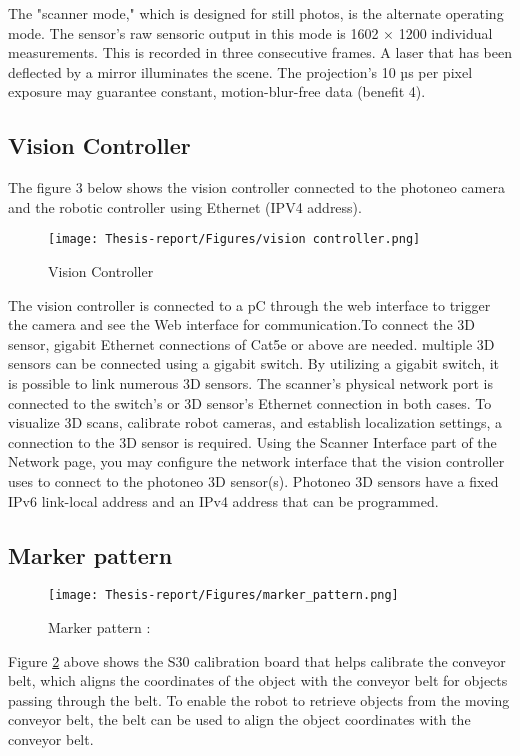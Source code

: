\documentclass[12pt]{article}
\begin{document}
The "scanner mode," which is designed for still photos, is the alternate operating mode.
 The sensor's raw sensoric output in this mode is 1602 × 1200 individual measurements. This is recorded in three consecutive frames. A laser that has been deflected by a mirror illuminates the scene.  The projection's 10 µs per pixel exposure may guarantee constant, motion-blur-free data (benefit 4)\cite{ref15}.


\subsection{Vision Controller}
The figure 3 below shows the vision controller connected to the photoneo camera and the robotic controller using Ethernet (IPV4 address).
\begin{figure}[h]
    \centering
    \texttt{[image: Thesis-report/Figures/vision controller.png]}
    \caption{Vision Controller \cite{ref2}}
    \label{fig:vision-controller}
\end{figure}
The vision controller is connected to a pC through the web interface to trigger the camera and see the Web interface for communication.To connect the 3D sensor, gigabit Ethernet connections of Cat5e or above are needed.  multiple 3D sensors can be connected using a gigabit switch.  By utilizing a gigabit switch, it is possible to link numerous 3D sensors.  The scanner's physical network port is connected to the switch's or 3D sensor's Ethernet connection in both cases. To visualize 3D scans, calibrate robot cameras, and establish localization settings, a connection to the 3D sensor is required. Using the Scanner Interface part of the Network page, you may configure the network interface that the vision controller uses to connect to the photoneo 3D sensor(s).  Photoneo 3D sensors have a fixed IPv6 link-local address and an IPv4 address that can be programmed.\cite{ref15}

\subsection{Marker pattern}
\begin{figure}[h]
    \centering
    \texttt{[image: Thesis-report/Figures/marker\_pattern.png]}
    \caption{Marker pattern \cite{ref2}:}
    \label{fig:marker-pattern}
\end{figure}

Figure \ref{fig:marker-pattern} above shows the S30 calibration board that helps calibrate the conveyor belt, which aligns the coordinates of the object with the conveyor belt for objects passing through the belt. To enable the robot to retrieve objects from the moving conveyor belt, the belt can be used to align the object coordinates with the conveyor belt\cite{ref2}.
\end{document}
